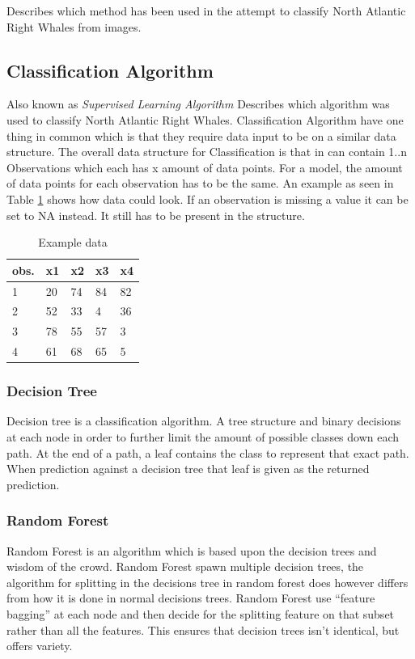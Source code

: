 Describes which method has been used in the attempt to classify North Atlantic Right Whales from images.

\subsection{Classification Algorithm}
Also known as \emph{Supervised Learning Algorithm}
Describes which algorithm was used to classify North Atlantic Right Whales. Classification Algorithm have one thing in common which is that they require data input to be on a similar data structure.
The overall data structure for Classification is that in can contain 1..n Observations which each has x amount of data points. For a model, the amount of data points for each observation has to be the same. An example as seen in Table \ref{tab:example data} shows how data could look.
If an observation is missing a value it can be set to NA instead. It still has to be present in the structure.

\begin{table}
  \centering
  \caption{Example data}
  \label{tab:example data}
  \begin{tabularx}{\linewidth}{|l|X|X|X|X|} \hline
    obs. & x1 & x2 & x3 & x4 \\ \hline
    1    & 20 & 74 & 84 & 82 \\ \hline
    2    & 52 & 33 & 4  & 36 \\ \hline
    3    & 78 & 55 & 57 & 3  \\ \hline
    4    & 61 & 68 & 65 & 5  \\ \hline
  \end{tabularx}
\end{table}

\subsubsection{Decision Tree}
Decision tree is a classification algorithm. A tree structure and binary decisions at each node in order to further limit the amount of possible classes down each path.
At the end of a path, a leaf contains the class to represent that exact path.
When prediction against a decision tree that leaf is given as the returned prediction.

\subsubsection{Random Forest}
Random Forest is an algorithm which is based upon the decision trees and wisdom of the crowd.
Random Forest spawn multiple decision trees, the algorithm for splitting in the decisions tree in random forest does however differs from how it is done in normal decisions trees.
Random Forest use ``feature bagging'' at each node and then decide for the splitting feature on that subset rather than all the features. This ensures that decision trees isn't identical, but offers variety.

